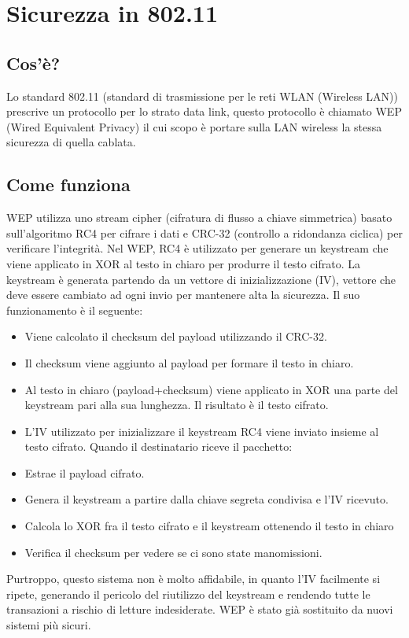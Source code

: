 \section{Sicurezza in 802.11}
\subsection{Cos'è?}
Lo standard 802.11 (standard di trasmissione per le reti WLAN (Wireless LAN)) prescrive un protocollo per lo strato data link, questo protocollo è chiamato WEP (Wired Equivalent Privacy) il cui scopo è portare sulla LAN wireless la stessa sicurezza di quella cablata.
\subsection{Come funziona}
WEP utilizza uno stream cipher (cifratura di flusso a chiave simmetrica) basato sull’algoritmo RC4 per cifrare i dati e CRC-32 (controllo a ridondanza ciclica) per verificare l’integrità.
Nel WEP, RC4 è utilizzato per generare un keystream che viene applicato in XOR al testo in chiaro per produrre il testo cifrato. La keystream è generata partendo da un vettore di inizializzazione (IV), vettore che deve essere cambiato ad ogni invio per mantenere alta la sicurezza.
Il suo funzionamento è il seguente:
\begin{itemize}
\item	Viene calcolato il checksum del payload utilizzando il CRC-32.
\item	Il checksum viene aggiunto al payload per formare il testo in chiaro.
\item	Al testo in chiaro (payload+checksum) viene applicato in XOR una parte del keystream pari alla sua lunghezza. Il risultato è il testo cifrato.
\item	L’IV utilizzato per inizializzare il keystream RC4 viene inviato insieme al testo cifrato.
Quando il destinatario riceve il pacchetto:
\item	Estrae il payload cifrato.
\item	Genera il keystream a partire dalla chiave segreta condivisa e l’IV ricevuto.
\item	Calcola lo XOR fra il testo cifrato e il keystream ottenendo il testo in chiaro
\item	Verifica il checksum per vedere se ci sono state manomissioni.
\end{itemize}
Purtroppo, questo sistema non è molto affidabile, in quanto l’IV facilmente si ripete, generando il pericolo del riutilizzo del keystream e rendendo tutte le transazioni a rischio di letture indesiderate. WEP è stato già sostituito da nuovi sistemi più sicuri.

